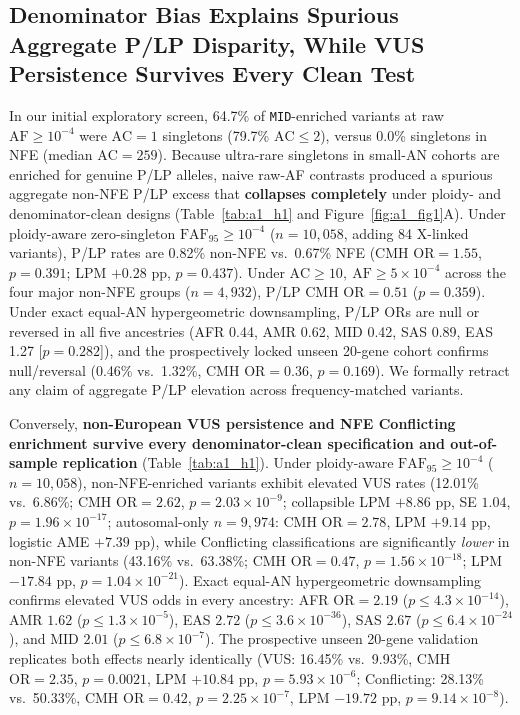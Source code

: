 \documentclass[11pt,letterpaper]{article}
\begin{document}
\subsection{Denominator Bias Explains Spurious Aggregate P/LP Disparity, While VUS Persistence Survives Every Clean Test}
In our initial exploratory screen, 64.7\% of \texttt{MID}-enriched variants at raw $\mathrm{AF}\ge 10^{-4}$ were $\mathrm{AC}=1$ singletons (79.7\% $\mathrm{AC}\le 2$), versus 0.0\% singletons in NFE (median $\mathrm{AC}=259$). Because ultra-rare singletons in small-AN cohorts are enriched for genuine P/LP alleles, naive raw-AF contrasts produced a spurious aggregate non-NFE P/LP excess that \textbf{collapses completely} under ploidy- and denominator-clean designs (Table~\ref{tab:a1_h1} and Figure~\ref{fig:a1_fig1}A). Under ploidy-aware zero-singleton $\mathrm{FAF}_{95}\ge 10^{-4}$ ($n=10,058$, adding 84 X-linked variants), P/LP rates are 0.82\% non-NFE vs.\ 0.67\% NFE (CMH $\mathrm{OR}=1.55$, $p=0.391$; LPM $+0.28$ pp, $p=0.437$). Under $\mathrm{AC}\ge 10,\ \mathrm{AF}\ge 5\times 10^{-4}$ across the four major non-NFE groups ($n=4,932$), P/LP CMH $\mathrm{OR}=0.51$ ($p=0.359$). Under exact equal-AN hypergeometric downsampling, P/LP ORs are null or reversed in all five ancestries (AFR 0.44, AMR 0.62, MID 0.42, SAS 0.89, EAS 1.27 [$p=0.282$]), and the prospectively locked unseen 20-gene cohort confirms null/reversal (0.46\% vs.\ 1.32\%, CMH $\mathrm{OR}=0.36$, $p=0.169$). We formally retract any claim of aggregate P/LP elevation across frequency-matched variants.

Conversely, \textbf{non-European VUS persistence and NFE Conflicting enrichment survive every denominator-clean specification and out-of-sample replication} (Table~\ref{tab:a1_h1}). Under ploidy-aware $\mathrm{FAF}_{95}\ge 10^{-4}$ ($n=10,058$), non-NFE-enriched variants exhibit elevated VUS rates (12.01\% vs.\ 6.86\%; CMH $\mathrm{OR}=2.62$, $p=2.03\times 10^{-9}$; collapsible LPM $+8.86$ pp, SE $1.04$, $p=1.96\times 10^{-17}$; autosomal-only $n=9,974$: CMH $\mathrm{OR}=2.78$, LPM $+9.14$ pp, logistic AME $+7.39$ pp), while Conflicting classifications are significantly \emph{lower} in non-NFE variants (43.16\% vs.\ 63.38\%; CMH $\mathrm{OR}=0.47$, $p=1.56\times 10^{-18}$; LPM $-17.84$ pp, $p=1.04\times 10^{-21}$). Exact equal-AN hypergeometric downsampling confirms elevated VUS odds in every ancestry: AFR $\mathrm{OR}=2.19$ ($p\le 4.3\times 10^{-14}$), AMR $1.62$ ($p\le 1.3\times 10^{-5}$), EAS $2.72$ ($p\le 3.6\times 10^{-36}$), SAS $2.67$ ($p\le 6.4\times 10^{-24}$), and MID $2.01$ ($p\le 6.8\times 10^{-7}$). The prospective unseen 20-gene validation replicates both effects nearly identically (VUS: 16.45\% vs.\ 9.93\%, CMH $\mathrm{OR}=2.35$, $p=0.0021$, LPM $+10.84$ pp, $p=5.93\times 10^{-6}$; Conflicting: 28.13\% vs.\ 50.33\%, CMH $\mathrm{OR}=0.42$, $p=2.25\times 10^{-7}$, LPM $-19.72$ pp, $p=9.14\times 10^{-8}$).
\end{document}
